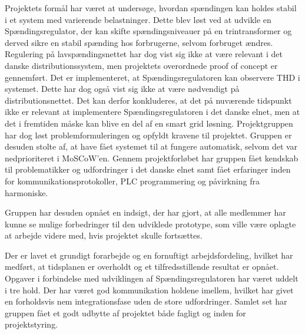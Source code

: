 

Projektets formål har været at undersøge, hvordan spændingen kan holdes stabil i et system med varierende belastninger. Dette blev løst ved at udvikle en Spændingsregulator, der kan skifte spændingsniveauer på en trintransformer og derved sikre en stabil spænding hos forbrugerne, selvom forbruget ændres. Regulering på lavspændingsnettet har dog vist sig ikke at være relevant i det danske distributionssystem, men projektets overordnede proof of concept er gennemført. Det er implementeret, at Spændingsregulatoren kan observere THD i systemet. Dette har dog også vist sig ikke at være nødvendigt på distributionsnettet. Det kan derfor konkluderes, at det på nuværende tidspunkt ikke er relevant at implementere Spændingsregulatoren i det danske elnet, men at det i fremtiden måske kan blive en del af en smart grid løsning. Projektgruppen har dog løst problemformuleringen og opfyldt kravene til projektet. Gruppen er desuden stolte af, at have fået systemet til at fungere automatisk, selvom det var nedprioriteret i MoSCoW'en. Gennem projektforløbet har gruppen fået kendskab til problematikker og udfordringer i det danske elnet samt fået erfaringer inden for kommunikationsprotokoller, PLC programmering og påvirkning fra harmoniske.  

Gruppen har desuden opnået en indsigt, der har gjort, at alle medlemmer har kunne se mulige forbedringer til den udviklede prototype, som ville være oplagte at arbejde videre med, hvis projektet skulle fortsættes.

Der er lavet et grundigt forarbejde og en fornuftigt arbejdsfordeling, hvilket har medført, at tidsplanen er overholdt og et tilfredsstillende resultat er opnået. Opgaver i forbindelse med udviklingen af Spændingsregulatoren har været uddelt i tre hold. Der har været god kommunikation holdene imellem, hvilket har givet en forholdsvis nem integrationsfase uden de store udfordringer. Samlet set har gruppen fået et godt udbytte af projektet både fagligt og inden for projektstyring.



 